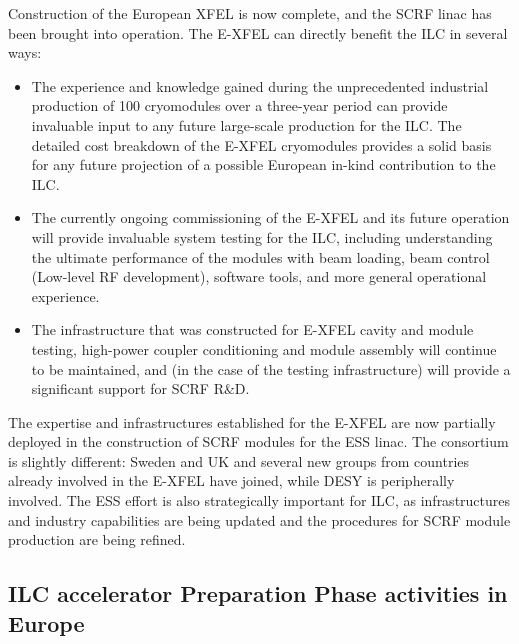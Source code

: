 \documentclass[%
 reprint,
 floatfix,
 amsmath,amssymb,
 aps,
]{revtex4-1}
\begin{document}
Construction of the European XFEL is now complete, and the SCRF linac has been brought into operation. The E-XFEL can directly benefit the ILC in several ways: 
\begin{itemize}
\item The experience and knowledge gained during the unprecedented industrial production of 100 cryomodules over a three-year period can provide 
invaluable input to any future large-scale production for the ILC. The detailed cost breakdown of the E-XFEL cryomodules 
provides a solid basis for any future projection of a possible European in-kind contribution to the ILC. 
\item 
The currently ongoing commissioning of the E-XFEL and its future operation will provide invaluable system testing for the ILC, 
including understanding the ultimate performance of the modules with beam loading, beam control (Low-level RF development), software tools, 
and more general operational experience. 
\item The infrastructure that was constructed for E-XFEL cavity and module
testing, high-power coupler conditioning and module assembly will continue to be maintained, and (in the case of the testing infrastructure) will provide a significant support for SCRF R\&D.
\end{itemize}

The expertise and infrastructures established for the E-XFEL are now partially deployed in the construction of SCRF modules for the ESS linac. 
The consortium is slightly different: Sweden and UK and several new groups from countries already involved in the E-XFEL have joined, while DESY is peripherally involved.
The ESS effort is also strategically important for ILC, as infrastructures and industry capabilities are being updated and the procedures for SCRF module production are being refined.

\subsection{ILC accelerator Preparation Phase activities in Europe ~\label{sec:acc:prephase}}
\end{document}
